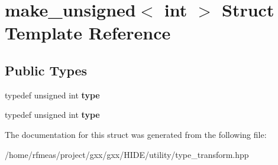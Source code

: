 \hypertarget{structmake__unsigned_3_01int_01_4}{}\section{make\+\_\+unsigned$<$ int $>$ Struct Template Reference}
\label{structmake__unsigned_3_01int_01_4}
\subsection*{Public Types}
\begin{DoxyCompactItemize}
\item 
typedef unsigned int {\bfseries type}\hypertarget{structmake__unsigned_3_01int_01_4_a110b4d3e6308d1f96375b58fbf69a246}{}\label{structmake__unsigned_3_01int_01_4_a110b4d3e6308d1f96375b58fbf69a246}

\item 
typedef unsigned int {\bfseries type}\hypertarget{structmake__unsigned_3_01int_01_4_a110b4d3e6308d1f96375b58fbf69a246}{}\label{structmake__unsigned_3_01int_01_4_a110b4d3e6308d1f96375b58fbf69a246}

\end{DoxyCompactItemize}


The documentation for this struct was generated from the following file\+:\begin{DoxyCompactItemize}
\item 
/home/rfmeas/project/gxx/gxx/\+H\+I\+D\+E/utility/type\+\_\+transform.\+hpp\end{DoxyCompactItemize}
